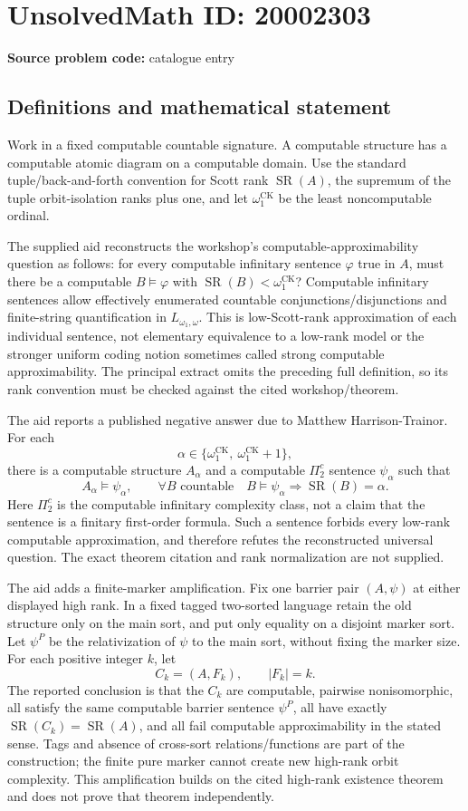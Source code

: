 \documentclass[11pt]{article}
\begin{document}
\section*{UnsolvedMath ID: 20002303}
\textbf{Source problem code:} catalogue entry
\subsection{Definitions and mathematical statement}
Work in a fixed computable countable signature. A computable structure has a computable atomic diagram on a computable domain. Use the standard tuple/back-and-forth convention for Scott rank \(\operatorname{SR}(A)\), the supremum of the tuple orbit-isolation ranks plus one, and let \(\omega_1^{\mathrm{CK}}\) be the least noncomputable ordinal.

The supplied aid reconstructs the workshop's computable-approximability question as follows: for every computable infinitary sentence \(\varphi\) true in \(A\), must there be a computable \(B\models\varphi\) with \(\operatorname{SR}(B)<\omega_1^{\mathrm{CK}}\)? Computable infinitary sentences allow effectively enumerated countable conjunctions/disjunctions and finite-string quantification in \(L_{\omega_1,\omega}\). This is low-Scott-rank approximation of each individual sentence, not elementary equivalence to a low-rank model or the stronger uniform coding notion sometimes called strong computable approximability. The principal extract omits the preceding full definition, so its rank convention must be checked against the cited workshop/theorem.

The aid reports a published negative answer due to Matthew Harrison-Trainor. For each
\[
\alpha\in\{\omega_1^{\mathrm{CK}},\ \omega_1^{\mathrm{CK}}+1\},
\]
there is a computable structure \(A_\alpha\) and a computable \(\Pi^c_2\) sentence \(\psi_\alpha\) such that
\[
A_\alpha\models\psi_\alpha,\qquad
\forall B\text{ countable}\quad B\models\psi_\alpha
\Rightarrow\operatorname{SR}(B)=\alpha.
\]
Here \(\Pi^c_2\) is the computable infinitary complexity class, not a claim that the sentence is a finitary first-order formula. Such a sentence forbids every low-rank computable approximation, and therefore refutes the reconstructed universal question. The exact theorem citation and rank normalization are not supplied.

The aid adds a finite-marker amplification. Fix one barrier pair \((A,\psi)\) at either displayed high rank. In a fixed tagged two-sorted language retain the old structure only on the main sort, and put only equality on a disjoint marker sort. Let \(\psi^P\) be the relativization of \(\psi\) to the main sort, without fixing the marker size. For each positive integer \(k\), let
\[
C_k=(A,F_k),\qquad |F_k|=k.
\]
The reported conclusion is that the \(C_k\) are computable, pairwise nonisomorphic, all satisfy the same computable barrier sentence \(\psi^P\), all have exactly \(\operatorname{SR}(C_k)=\operatorname{SR}(A)\), and all fail computable approximability in the stated sense. Tags and absence of cross-sort relations/functions are part of the construction; the finite pure marker cannot create new high-rank orbit complexity. This amplification builds on the cited high-rank existence theorem and does not prove that theorem independently.
\end{document}
